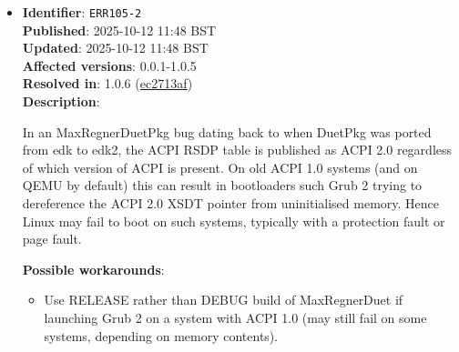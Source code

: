 \documentclass[]{article}
\providecommand{\tightlist}{%
  \setlength{\itemsep}{0pt}\setlength{\parskip}{0pt}}
\begin{document}
\begin{itemize}
\begin{itemize}
    \item Enable \texttt{SyncRuntimePermissions} quirk.

  \end{itemize}

\item
  \textbf{Identifier}: \texttt{ERR105-2} \\
  \textbf{Published}: 2025-10-12 11:48 BST \\
  \textbf{Updated}: 2025-10-12 11:48 BST \\
  \textbf{Affected versions}: 0.0.1-1.0.5 \\
  \textbf{Resolved in}: 1.0.6 (\href{https://github.com/acidanthera/MaxRegnerPkg/commit/ec2713af48a0538a4a56e4e304d699b847d78194}{ec2713af}) \\
  \textbf{Description}:

  In an MaxRegnerDuetPkg bug dating back to when DuetPkg was ported from edk to edk2, the ACPI RSDP table
  is published as ACPI 2.0 regardless of which version of ACPI is present. On old ACPI 1.0 systems
  (and on QEMU by default) this can result in bootloaders such Grub 2 trying to dereference the
  ACPI 2.0 XSDT pointer from uninitialised memory. Hence Linux may fail to boot on such systems,
  typically with a protection fault or page fault.

  \textbf{Possible workarounds}:
  \begin{itemize}
    \tightlist

    \item Use RELEASE rather than DEBUG build of MaxRegnerDuet if launching Grub 2 on a system with
    ACPI 1.0 (may still fail on some systems, depending on memory contents).

  \end{itemize}

\end{itemize}
\end{document}

